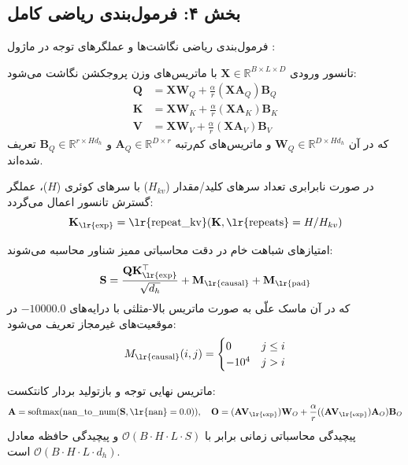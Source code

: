 \subsection*{بخش ۴: فرمول‌بندی ریاضی کامل }
فرمول‌بندی ریاضی نگاشت‌ها و عملگرهای توجه در ماژول :

تانسور ورودی $\mathbf{X} \in \mathbb{R}^{B \times L \times D}$ با ماتریس‌های وزن پروجکشن نگاشت می‌شود:
\begin{align}
\mathbf{Q} &= \mathbf{X} \mathbf{W}_Q + \frac{\alpha}{r} (\mathbf{X} \mathbf{A}_Q) \mathbf{B}_Q \\
\mathbf{K} &= \mathbf{X} \mathbf{W}_K + \frac{\alpha}{r} (\mathbf{X} \mathbf{A}_K) \mathbf{B}_K \\
\mathbf{V} &= \mathbf{X} \mathbf{W}_V + \frac{\alpha}{r} (\mathbf{X} \mathbf{A}_V) \mathbf{B}_V
\end{align}
که در آن $\mathbf{W}_Q \in \mathbb{R}^{D \times H d_h}$ و ماتریس‌های کم‌رتبه $\mathbf{A}_Q \in \mathbb{R}^{D \times r}$ و $\mathbf{B}_Q \in \mathbb{R}^{r \times H d_h}$ تعریف شده‌اند.

در صورت نابرابری تعداد سرهای کلید/مقدار ($H_{kv}$) با سرهای کوئری ($H$)، عملگر گسترش تانسور  اعمال می‌گردد:
\begin{equation}
\mathbf{K}_{\text{\lr{exp}}} = \text{\lr{repeat\_kv}}(\mathbf{K}, \text{\lr{repeats}}=H / H_{kv})
\end{equation}

امتیازهای شباهت خام در دقت محاسباتی ممیز شناور  محاسبه می‌شوند:
\begin{equation}
\mathbf{S} = \frac{\mathbf{Q} \mathbf{K}_{\text{\lr{exp}}}^\top}{\sqrt{d_h}} + \mathbf{M}_{\text{\lr{causal}}} + \mathbf{M}_{\text{\lr{pad}}}
\end{equation}
که در آن ماسک علّی به صورت ماتریس بالا-مثلثی با درایه‌های $-10000.0$ در موقعیت‌های غیرمجاز تعریف می‌شود:
\begin{equation}
M_{\text{\lr{causal}}}(i, j) = \begin{cases} 0 & j \le i \\ -10^4 & j > i \end{cases}
\end{equation}

ماتریس نهایی توجه و بازتولید بردار کانتکست:
\begin{equation}
\mathbf{A} = \operatorname{softmax}(\operatorname{nan\_to\_num}(\mathbf{S}, \text{\lr{nan}}=0.0)), \quad \mathbf{O} = (\mathbf{A} \mathbf{V}_{\text{\lr{exp}}}) \mathbf{W}_O + \frac{\alpha}{r} ((\mathbf{A} \mathbf{V}_{\text{\lr{exp}}}) \mathbf{A}_O) \mathbf{B}_O
\end{equation}
پیچیدگی محاسباتی زمانی برابر با $\mathcal{O}(B \cdot H \cdot L \cdot S)$ و پیچیدگی حافظه معادل $\mathcal{O}(B \cdot H \cdot L \cdot d_h)$ است.


